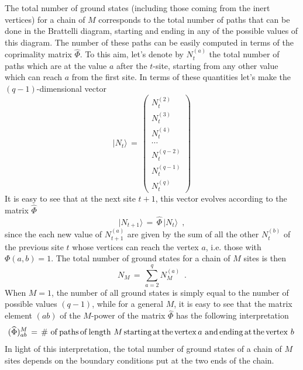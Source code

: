 \documentclass[aps,pra,superscriptaddress]{revtex4}
\newcommand\be            {\begin{equation}}
\newcommand\ee            {\end{equation}}
\renewcommand{\(}{\left(}
\renewcommand{\)}{\right)}
\renewcommand{\[}{\left[}
\renewcommand{\]}{\right]}
\renewcommand\vec[1]{{\vert{#1}\rangle}}
\begin{document}
The total number of ground states (including those coming from the inert vertices) for a chain of $M$ corresponds to the 
total number of paths that can be done in the Brattelli diagram, starting and ending in any of the possible values of this 
diagram. The number of these paths can be easily computed in terms of the coprimality matrix $\widehat \Phi$. To this aim, 
let's denote by $N^{(a)}_t$ the total number of paths which are at the value $a$ after the $t$-site, starting from any other value 
which can reach $a$ from the first site. In terms of these quantities let's make the $(q-1)$-dimensional vector 
\be
\vec {N_t} \,=\, 
\left(
\begin{array}{l}
N^{(2)}_t \\
N^{(3)}_t \\
N^{(4)}_t \\
\cdots \\
N^{(q-2)}_t \\
N^{(q-1)}_t \\
N^{(q)}_t 
\end{array}
\right)
\label{tauvectors} 
\ee
It is easy to see that at the next site $t +1$, this vector evolves according to the matrix $\widehat\Phi$ 
\be 
\vec{ N_{t+1}} \,=\, \widehat \Phi \, \vec {N_t} \,\,\,,
\label{recursive}
\ee
since the each new value of $N^{(a)}_{t +1}$ are given by the sum of all the other $N^{(b)}_t$ of the previous site $t$ whose vertices can reach the vertex $a$, i.e. those with $\Phi(a,b) = 1$. The total number of ground states for a chain of $M$ sites is then 
\be 
N_M \,=\, \sum_{a=2}^q  N^{(a)}_M \,\,\,.
\ee
When $M=1$, the number of all ground states is simply equal to the number of possible values $(q-1)$, 
while for a general $M$, it is easy to see that the matrix element $(a b)$ of the $M$-power of the matrix $\widehat \Phi$ 
has the following interpretation 
\be
(\widehat \Phi)^M_{a b} \,=\,\# \,{\rm \,of\, paths\, of\, length\, }\, M \, {\rm starting\, at \,the \,vertex} \,a\, {\rm \,and \,ending\, at\, the\, vertex\, } \,b\,
\ee 
In light of this interpretation, the total number of ground states of a chain of $M$ sites depends on the boundary conditions put at the two ends of the 
chain. 
\end{document}
